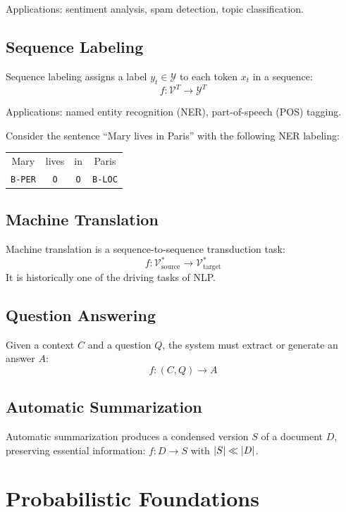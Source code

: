 Applications: sentiment analysis, spam detection, topic classification.

\subsection{Sequence Labeling}

Sequence labeling assigns a label $y_t \in \mathcal{Y}$ to each token $x_t$
in a sequence:
\[
f : \mathcal{V}^T \to \mathcal{Y}^T
\]

Applications: named entity recognition (NER), part-of-speech (POS) tagging.

\begin{example}
Consider the sentence ``Mary lives in Paris'' with the following NER labeling:
\begin{center}
\begin{tabular}{cccc}
Mary & lives & in & Paris \\
\texttt{B-PER} & \texttt{O} & \texttt{O} & \texttt{B-LOC}
\end{tabular}
\end{center}
\end{example}

\subsection{Machine Translation}

Machine translation is a sequence-to-sequence transduction task:
\[
f : \mathcal{V}_{\text{source}}^* \to \mathcal{V}_{\text{target}}^*
\]
It is historically one of the driving tasks of NLP.

\subsection{Question Answering}

Given a context $C$ and a question $Q$, the system must extract or generate an
answer $A$:
\[
f : (C, Q) \to A
\]

\subsection{Automatic Summarization}

Automatic summarization produces a condensed version $S$ of a document $D$,
preserving essential information: $f : D \to S$ with $\left| S \right| \ll \left| D \right|$.

\section{Probabilistic Foundations}
\label{sec:intro:proba}

